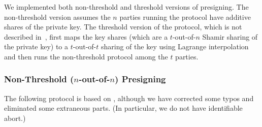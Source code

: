 \documentclass[11pt]{article}
\newcommand{\?}[1]{\stackrel{?}{#1}}
\begin{document}
We implemented both non-threshold and threshold versions of presigning. 
The non-threshold version assumes the $n$ parties running the protocol have additive shares of the private key. 
The threshold version of the protocol, which is not described in~\cite{cggmp24}, first maps the key shares (which are a $t$-out-of-$n$ Shamir sharing of the private key) to a $t$-out-of-$t$ sharing of the key using Lagrange interpolation and then runs the non-threshold protocol among the $t$ parties.



\subsubsection{Non-Threshold ($n$-out-of-$n$) Presigning} \label{section:orig-presigning}

The following protocol is based on \cite[Figure~8]{cggmp24}, although we have corrected some typos and eliminated some extraneous parts. (In particular, we do not have identifiable abort.)
\end{document}
